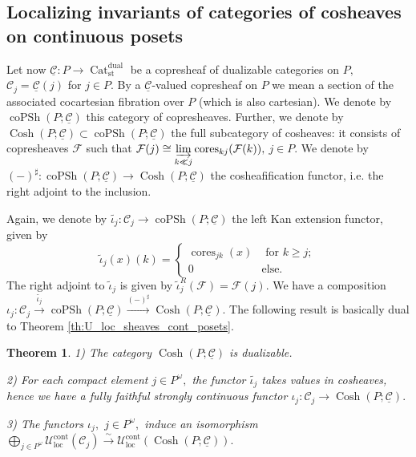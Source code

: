 \documentclass[11pt,leqno]{amsart}
\newtheorem{theo}{Theorem}[section]
\numberwithin{equation}{section}
\newcommand{\indlim}[1][]{\mathop{\varinjlim}\limits_{#1}}
\newcommand{\biggplus}[1][]{\mathop{\bigoplus}\limits_{#1}}
\newcommand{\xto}{\xrightarrow}
\newcommand{\Cat}{\operatorname{Cat}}
\newcommand{\loc}{\operatorname{loc}}
\newcommand{\cont}{\operatorname{cont}}
\newcommand{\st}{\operatorname{st}}
\newcommand{\dual}{\operatorname{dual}}
\newcommand{\cF}{{\mathcal F}}
\newcommand{\cC}{{\mathcal C}}
\newcommand{\cU}{{\mathcal U}}
\newcommand{\un}{\underline}
\newcommand{\copsh}{\operatorname{coPSh}}
\newcommand{\Cosh}{\operatorname{Cosh}}
\newcommand{\cores}{\operatorname{cores}}
\begin{document}
\subsection{Localizing invariants of categories of cosheaves on continuous posets}
\label{ssec:cosheaves_cont_posets}

Let now $\un{\cC}:P\to\Cat_{\st}^{\dual}$ be a copresheaf of dualizable categories on $P,$ $\cC_j=\un{\cC}(j)$ for $j\in P.$ By a $\un{\cC}$-valued copresheaf on $P$ we mean a section of the associated cocartesian fibration over $P$ (which is also cartesian). We denote by $\copsh(P;\un{\cC})$ this category of copresheaves. Further, we denote by $\Cosh(P;\un{\cC})\subset \copsh(P;\un{\cC})$ the full subcategory of cosheaves: it consists of copresheaves $\cF$ such that $\cF(j)\cong \indlim[k\ll j]\cores_{kj}(\cF(k)),$ $j\in P.$ We denote by $(-)^{\sharp}:\copsh(P;\un{\cC})\to \Cosh(P;\un{\cC})$ the cosheafification functor, i.e. the right adjoint to the inclusion.

Again, we denote by $\tilde{\iota_j}:\cC_j\to\copsh(P;\un{\cC})$ the left Kan extension functor, given by
$$\tilde{\iota}_j(x)(k)=\begin{cases}\cores_{jk}(x) & \text{ for }k\geq j;\\
0 & \text{else.}\end{cases}$$
The right adjoint to $\tilde{\iota}_j$ is given by $\tilde{\iota}_j^R(\cF)=\cF(j).$ We have a composition $\iota_j:\cC_j\xto{\tilde{\iota_j}}\copsh(P;\un{\cC})\xto{(-)^{\sharp}}\Cosh(P;\un{\cC}).$ The following result is basically dual to Theorem \ref{th:U_loc_sheaves_cont_posets}.

\begin{theo}\label{th:U_loc_cosheaves_on_cont_posets} 1) The category $\Cosh(P;\un{\cC})$ is dualizable.

2) For each compact element $j\in P^{\omega},$ the functor $\tilde{\iota_j}$ takes values in cosheaves, hence we have a fully faithful strongly continuous functor $\iota_j:\cC_j\to\Cosh(P;\un{\cC}).$

3) The functors $\iota_j,$ $j\in P^{\omega},$ induce an isomorphism $\biggplus[j\in P^{\omega}]\cU_{\loc}^{\cont}(\cC_j)\xto{\sim} \cU_{\loc}^{\cont}(\Cosh(P;\un{\cC})).$ 
\end{theo}
\end{document}
